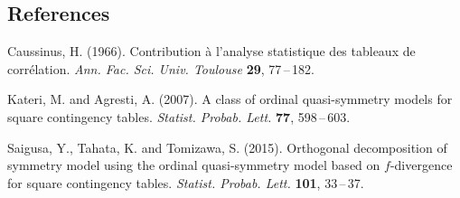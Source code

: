 \documentclass[12pt]{article}
\begin{document}
%        
%
%        

\subsection*{References}

\begin{description}

\item
Caussinus, H. (1966).
Contribution \`a l'analyse statistique des tableaux de corr\'elation. 
{\it Ann. Fac. Sci. Univ. Toulouse} {\bf 29}, 77\,--\,182.

\item
Kateri, M. and Agresti, A. (2007).
A class of ordinal quasi-symmetry models for square contingency tables.
{\it Statist. Probab. Lett.} {\bf 77}, 598\,--\,603.

\item
Saigusa, Y., Tahata, K. and Tomizawa, S. (2015).
Orthogonal decomposition of symmetry model using the ordinal quasi-symmetry model based on $f$-divergence for square contingency tables.
{\it Statist. Probab. Lett.} {\bf 101}, 33\,--\,37.

\end{description}
\end{document}
